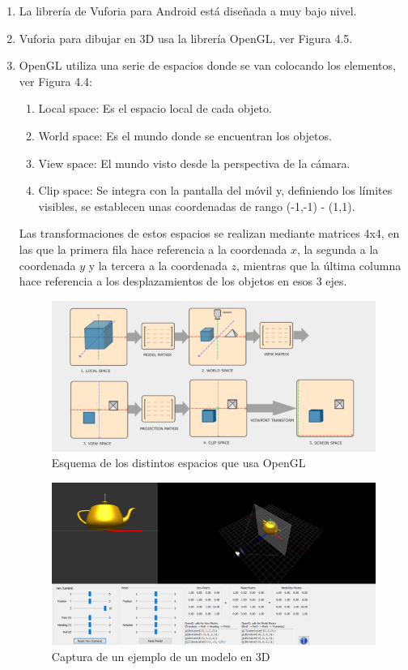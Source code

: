 \begin{enumerate}
    \item La librería de Vuforia para Android está diseñada a muy bajo nivel.
    \item Vuforia para dibujar en 3D usa la librería OpenGL, ver Figura 4.5.
    \item OpenGL utiliza una serie de espacios donde se van colocando los elementos, ver Figura 4.4: 
    \begin{enumerate}
        \item Local space: Es el espacio local de cada objeto.
        \item World space: Es el mundo donde se encuentran los objetos.
        \item View space: El mundo visto desde la perspectiva de la cámara.
        \item Clip space: Se integra con la pantalla del móvil y, definiendo los límites visibles, se establecen unas coordenadas de rango (-1,-1) - (1,1).
    \end{enumerate}
    
        Las transformaciones de estos espacios se realizan mediante matrices 4x4, 
        en las que la primera fila hace referencia a la coordenada $x$, la segunda a la coordenada $y$ y la 
        tercera a la coordenada $z$, mientras que la última columna hace referencia a los desplazamientos 
        de los objetos en esos 3 ejes.
            \begin{figure}[H]
                \centering
                \includegraphics[width=5in]{figures/space-transformation.png}
                \caption{Esquema de los distintos espacios que usa OpenGL\cite{spaceopengl}}
            \end{figure}


            \begin{figure}[H]
                \centering
                \includegraphics[width=5in]{figures/teapot.png}
                \caption{Captura de un ejemplo de un modelo en 3D}
            \end{figure}


\end{enumerate}
